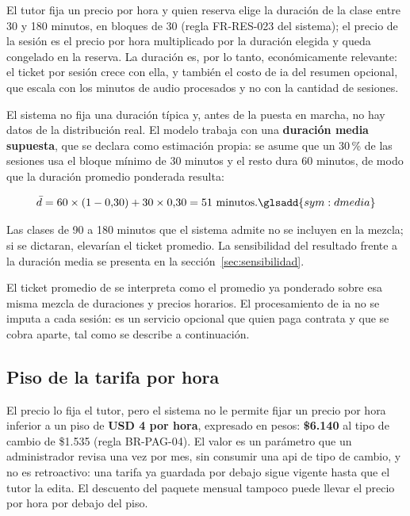 El tutor fija un precio por hora y quien reserva elige la duración de la
clase entre 30 y 180 minutos, en bloques de 30 (regla FR-RES-023 del
sistema); el precio de la sesión es el precio por hora multiplicado por la
duración elegida y queda congelado en la reserva. La duración es, por lo
tanto, económicamente relevante: el ticket por sesión crece con ella, y
también el costo de \gls{ia} del resumen opcional, que escala con los
minutos de audio procesados y no con la cantidad de sesiones.

El sistema no fija una duración típica y, antes de la puesta en marcha, no hay datos
de la distribución real. El modelo trabaja con una \textbf{duración media
supuesta}, que se declara como estimación propia: se asume que un
30\,\% de las sesiones usa el bloque mínimo de 30 minutos y el resto dura
60 minutos, de modo que la duración promedio ponderada resulta:

\begin{equation}
    \bar{d} = 60 \times (1 - 0{,}30) + 30 \times 0{,}30 = 51 \text{ minutos.}
    \glsadd{sym:dmedia}%
    \label{eq:duracion}
\end{equation}

Las clases de 90 a 180 minutos que el sistema admite no se incluyen en la
mezcla; si se dictaran, elevarían el ticket promedio. La
sensibilidad del resultado frente a la duración media se presenta en la
sección~\ref{sec:sensibilidad}.

El ticket promedio de  se interpreta como el promedio ya
ponderado sobre esa misma mezcla de duraciones y precios horarios. El
procesamiento de \gls{ia} no se imputa a cada sesión: es un servicio
opcional que quien paga contrata y que se cobra aparte, tal como se
describe a continuación.

\subsection{Piso de la tarifa por hora}\label{sec:piso-tarifa}

El precio lo fija el tutor, pero el sistema no le permite fijar un precio
por hora inferior a un piso de \textbf{USD 4 por hora}, expresado en
pesos: \textbf{\$6.140} al tipo de cambio de \$1.535 (regla BR-PAG-04).
El valor es un parámetro que un administrador revisa una vez por mes, sin
consumir una \gls{api} de tipo de cambio, y no es retroactivo: una tarifa
ya guardada por debajo sigue vigente hasta que el tutor la edita. El
descuento del paquete mensual tampoco puede llevar el precio por hora por
debajo del piso.

